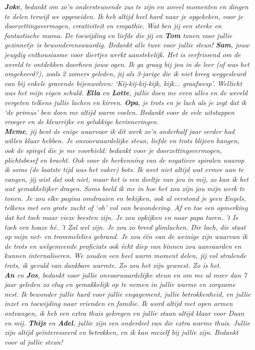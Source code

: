 \documentclass[10pt, twoside]{book} %
\begin{document}
\begin{small}
\textit{\textbf{Joke}, bedankt om zo'n ondersteunende zus te zijn en zoveel momenten en dingen te delen terwijl we opgroeiden. Ik heb altijd heel hard naar je opgekeken, voor je doorzettingsvermogen, creativiteit en empathie. Wat ben jij een sterke en fantastische mama. De toewijding en liefde die jij en \textbf{Tom} tonen voor jullie gezinnetje is bewonderenswaardig. Bedankt alle twee voor jullie steun! \textbf{Sam}, jouw jeugdig enthousiasme voor diertjes werkt aanstekelijk. Het is verfrissend om de wereld te ontdekken doorheen jouw ogen. Ik ga graag bij jou in de leer (of was het omgekeerd?), zoals 2 zomers geleden, jij als 3-jarige die ik niet kreeg weggesleurd van bij enkele gravende bijenwolven: `Kij-kij-kij-kijk, kijk... graafwesp'. Wellicht was het mijn eigen schuld. \textbf{Ella} en \textbf{Lotte}, jullie doen me even alles en de wereld vergeten telkens jullie lachen en kirren. \textbf{Opa}, je trots en je lach als je zegt dat ik `de primus' ben doen me altijd warm voelen. Bedankt voor de vele uitstappen vroeger en de kleurrijke en gelukkige herinneringen.}\\

\textit{\textbf{Meme}, jij bent de enige waarvoor ik dit werk zo'n anderhalf jaar eerder had willen klaar hebben. Je onvoorwaardelijke steun, liefde en trots blijven hangen, ook de spiegel die je me voorhield: bedankt voor je doorzettingsvermogen, plichtsbesef en kracht. Ook voor de herkenning van de negatieve spiralen waarop ik soms (de laatste tijd was het vaker) bots. Ik weet niet altijd wat ermee aan te vangen, jij wist dat ook niet, maar het is een deeltje van jou in mij, zo kan ik het wat gemakkelijker dragen. Soms beeld ik me in hoe het zou zijn jou mijn werk te tonen. Je zou elke pagina omdraaien en bekijken, ook al verstond je geen Engels, telkens met een grote zucht of `oh' vol van bewondering. Af en toe een opmerking dat het toch maar vieze beesten zijn. Je zou opkijken en naar papa turen. 't Is toch een hoaze hé. 't Zal wel zijn. Je zou zo breed glimlachen. Die lach, die staat op mijn net- en trommelvlies gebrand. Je zou één van de weinige zijn waarvan ik de trots en welgemeende proficiats ook écht diep van binnen zou aanvaarden en kunnen internaliseren. We zouden een heel warm moment delen, jij vol stralende trots, ik gevuld van dankbare warmte. Zo zou het zijn geweest. Zo is het.}\\

\textit{\textbf{An} en \textbf{Jos}, bedankt voor jullie onvoorwaardelijke steun en om me al meer dan 7 jaar geleden zo vlug en gemakkelijk op te nemen in jullie warme en zorgzame nest. Ik bewonder jullie hard voor jullie engagement, jullie betrokkenheid, en jullie inzet en toewijding naar vrienden en familie. Ik word altijd met open armen ontvangen, ik heb een extra thuis gekregen en jullie staan altijd klaar voor Daan en mij. \textbf{Thijs} en \textbf{Adel}, jullie zijn een onderdeel van die extra warme thuis. Jullie zijn altijd geïnteresseerd en betrokken, en ik kan mezelf bij jullie zijn. Bedankt voor al jullie steun!}\\


\end{small}
\end{document}
